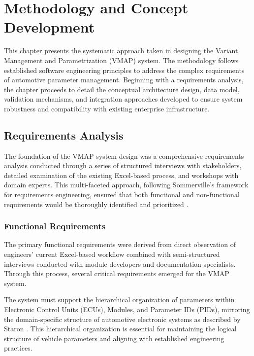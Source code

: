 \chapter{Methodology and Concept Development}
\label{chap:methodology}

This chapter presents the systematic approach taken in designing the Variant Management and Parametrization (VMAP) system. The methodology follows established software engineering principles to address the complex requirements of automotive parameter management. Beginning with a requirements analysis, the chapter proceeds to detail the conceptual architecture design, data model, validation mechanisms, and integration approaches developed to ensure system robustness and compatibility with existing enterprise infrastructure.

\section{Requirements Analysis}
\label{sec:requirements-analysis}

The foundation of the VMAP system design was a comprehensive requirements analysis conducted through a series of structured interviews with stakeholders, detailed examination of the existing Excel-based process, and workshops with domain experts. This multi-faceted approach, following Sommerville's framework for requirements engineering, ensured that both functional and non-functional requirements would be thoroughly identified and prioritized \cite{sommerville2011software}.

\subsection{Functional Requirements}
\label{subsec:functional-requirements}

The primary functional requirements were derived from direct observation of engineers' current Excel-based workflow combined with semi-structured interviews conducted with module developers and documentation specialists. Through this process, several critical requirements emerged for the VMAP system.

The system must support the hierarchical organization of parameters within Electronic Control Units (ECUs), Modules, and Parameter IDs (PIDs), mirroring the domain-specific structure of automotive electronic systems as described by Staron \cite{staron2021automotive}. This hierarchical organization is essential for maintaining the logical structure of vehicle parameters and aligning with established engineering practices.

